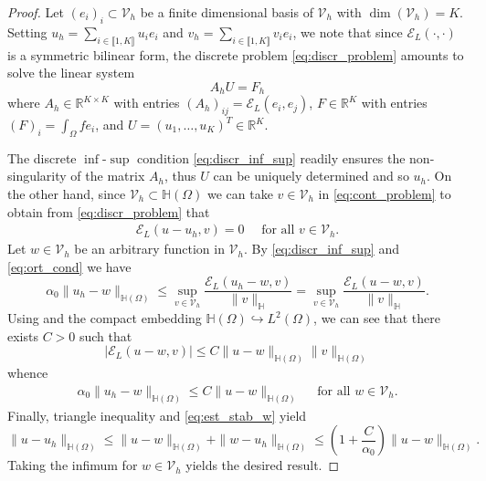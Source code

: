 \documentclass[10 pt]{article}
\newcommand\inter[1]{\llbracket #1\rrbracket}
\numberwithin{equation}{section}
\def\R{\mathbb{R}}
\def\cE{\mathcal{E}}
\begin{document}
\begin{proof}
Let $(e_i)_i\subset \mathcal V_h$ be a finite dimensional basis of $\mathcal V_h$ with $\dim(\mathcal V_h)=K$. Setting $u_h=\sum_{i\in\inter{1,K}}u_i e_i$ and $v_h=\sum_{i\in\inter{1,K}} v_i e_i$, we note that since $\cE_{L}(\cdot,\cdot)$ is a symmetric bilinear form, the discrete problem \eqref{eq:discr_problem} amounts to solve the linear system 
%
\begin{equation}
    A_h U = F_h
\end{equation}
%
where $A_h\in\mathbb R^{K\times K}$ with entries $(A_h)_{ij}=\cE_L(e_i,e_j)$, $F\in\R^{K}$ with entries $(F)_i=\int_{\Omega}f e_i$, and $U=(u_1,\ldots, u_K)^T\in \R^{K}$. 

The discrete $\inf$-$\sup$ condition \eqref{eq:discr_inf_sup} readily ensures the non-singularity of the matrix $A_h$, thus $U$ can be uniquely determined and so $u_h$. On the other hand, since $\mathcal V_h\subset \mathbb H(\Omega)$ we can take $v\in \mathcal V_h$ in \eqref{eq:cont_problem} to obtain from \eqref{eq:discr_problem} that
%
\begin{align}\label{eq:ort_cond}
    \cE_{L}(u-u_h,v)=0 \quad\text{ for all } v\in\mathcal V_h.
\end{align}
%
Let $w\in\mathcal V_h$ be an arbitrary function in $\mathcal V_h$. By \eqref{eq:discr_inf_sup} and \eqref{eq:ort_cond} we have
%
\begin{equation}
    \alpha_0\|u_h-w\|_{\mathbb H(\Omega)} \leq \sup_{v\in\mathcal V_h}\frac{\cE_{L}(u_h-w,v)}{\|v\|_{\mathbb H}}=\sup_{v\in\mathcal V_h}\frac{\cE_{L}(u-w,v)}{\|v\|_{\mathbb H}}.
\end{equation}
%
Using \cite[Lemma 3.4]{HSS22} and the compact embedding $\mathbb H(\Omega)\hookrightarrow L^2(\Omega)$, we can see that there exists $C>0$ such that
%
\begin{equation*}
    |\cE_{L}(u-w,v)|\leq C\|u-w\|_{\mathbb H(\Omega)}\|v\|_{\mathbb H(\Omega)}
\end{equation*}
%
whence
%
\begin{align}\label{eq:est_stab_w}
    \alpha_0\|u_h-w\|_{\mathbb H(\Omega)} \leq C\|u-w\|_{\mathbb H(\Omega)} \quad\text{ for all } w\in\mathcal V_h.
\end{align}
Finally, triangle inequality and \eqref{eq:est_stab_w} yield
%
\begin{equation}
    \|u-u_h\|_{\mathbb H(\Omega)}\leq \|u-w\|_{\mathbb H(\Omega)}+\|w-u_h\|_{\mathbb H(\Omega)}\leq \left(1+\frac{C}{\alpha_0}\right)\|u-w\|_{\mathbb H(\Omega)}.
\end{equation}
%
Taking the infimum for $w\in \mathcal V_h$ yields the desired result. 
\end{proof}
\end{document}
